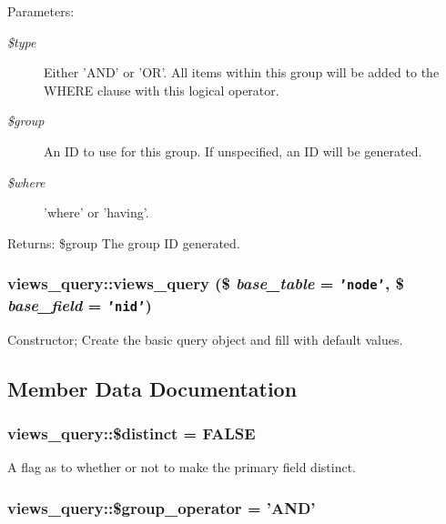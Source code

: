 \begin{Desc}
\item[Parameters:]
\begin{description}
\item[{\em \$type}]Either 'AND' or 'OR'. All items within this group will be added to the WHERE clause with this logical operator. \item[{\em \$group}]An ID to use for this group. If unspecified, an ID will be generated. \item[{\em \$where}]'where' or 'having'.\end{description}
\end{Desc}
\begin{Desc}
\item[Returns:]\$group The group ID generated. \end{Desc}
\hypertarget{classviews__query_fa6130b3c7d7a5a5edb03069bb7d8995}{
\subsubsection[{views\_\-query}]{\setlength{\rightskip}{0pt plus 5cm}views\_\-query::views\_\-query (\$ {\em base\_\-table} = {\tt 'node'}, \/  \$ {\em base\_\-field} = {\tt 'nid'})}}
\label{classviews__query_fa6130b3c7d7a5a5edb03069bb7d8995}


Constructor; Create the basic query object and fill with default values. 

\subsection{Member Data Documentation}
\hypertarget{classviews__query_48c0f8c68da79257d96109835021305c}{
\subsubsection[{\$distinct}]{\setlength{\rightskip}{0pt plus 5cm}views\_\-query::\$distinct = FALSE}}
\label{classviews__query_48c0f8c68da79257d96109835021305c}


A flag as to whether or not to make the primary field distinct. \hypertarget{classviews__query_a290c68d4f2fd7ccc73219ce5e57d0f7}{
\subsubsection[{\$group\_\-operator}]{\setlength{\rightskip}{0pt plus 5cm}views\_\-query::\$group\_\-operator = 'AND'}}
\label{classviews__query_a290c68d4f2fd7ccc73219ce5e57d0f7}


